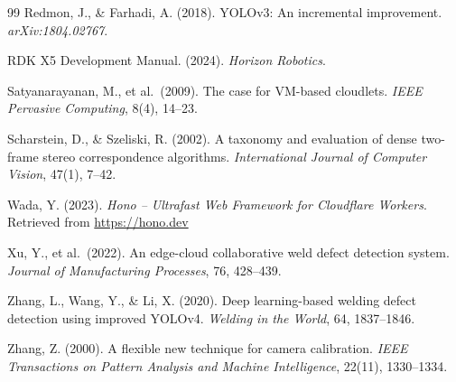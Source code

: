 \documentclass[12pt,a4paper]{article}
\begin{document}
\begin{thebibliography}{99}
Redmon, J., \& Farhadi, A. (2018). YOLOv3: An incremental improvement. \textit{arXiv:1804.02767}.

RDK X5 Development Manual. (2024). \textit{Horizon Robotics}.

Satyanarayanan, M., et al.\ (2009). The case for VM-based cloudlets.
\textit{IEEE Pervasive Computing}, 8(4), 14--23.

Scharstein, D., \& Szeliski, R. (2002). A taxonomy and evaluation of dense two-frame stereo correspondence
algorithms. \textit{International Journal of Computer Vision}, 47(1), 7--42.

Wada, Y. (2023). \textit{Hono -- Ultrafast Web Framework for Cloudflare Workers}.
Retrieved from \url{https://hono.dev}

Xu, Y., et al.\ (2022). An edge-cloud collaborative weld defect detection system.
\textit{Journal of Manufacturing Processes}, 76, 428--439.

Zhang, L., Wang, Y., \& Li, X. (2020). Deep learning-based welding defect detection using improved YOLOv4.
\textit{Welding in the World}, 64, 1837--1846.

Zhang, Z. (2000). A flexible new technique for camera calibration.
\textit{IEEE Transactions on Pattern Analysis and Machine Intelligence}, 22(11), 1330--1334.

\end{thebibliography}
\end{document}
